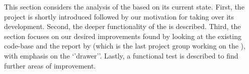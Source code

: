 This section considers the analysis of the \launcher based on its current state.
First, the \launcher project is shortly introduced followed by our motivation for taking over its development.
Second, the deeper functionality of the \launcher is described.
Third, the section focuses on our desired improvements found by looking at the existing code-base and the report by \citet{launcher2012} (which is the last project group working on the \launcher), with emphasis on the `'drawer''.
Lastly, a functional test is described to find further areas of improvement.